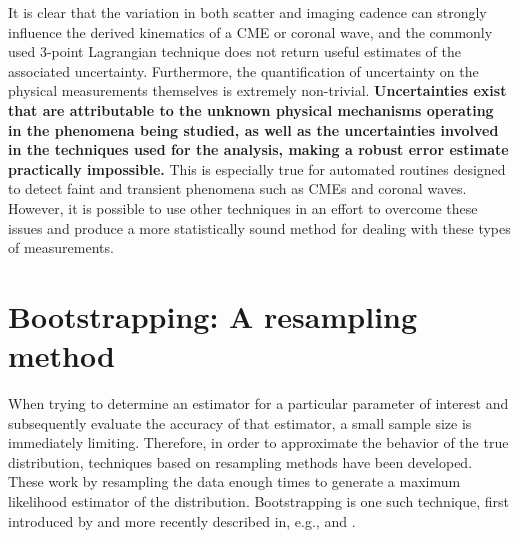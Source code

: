 \documentclass[structabstract]{aa}
\begin{document}
It is clear that the variation in both scatter and imaging cadence can strongly influence the derived kinematics of a CME or coronal wave, and the commonly used 3-point Lagrangian technique does not return useful estimates of the associated uncertainty. Furthermore, the quantification of uncertainty on the physical measurements themselves is extremely non-trivial. {\bf Uncertainties exist that are attributable to the unknown physical mechanisms operating in the phenomena being studied, as well as the uncertainties involved in the techniques used for the analysis, making a robust error estimate practically impossible.} This is especially true for automated routines designed to detect faint and transient phenomena such as CMEs and coronal waves. However, it is possible to use other techniques in an effort to overcome these issues and produce a more statistically sound method for dealing with these types of measurements.


\section{Bootstrapping: A resampling method}
\label{sect:bootstrapping}

When trying to determine an estimator for a particular parameter of interest and subsequently evaluate the accuracy of that estimator, a small sample size is immediately limiting. Therefore, in order to approximate the behavior of the true distribution, techniques based on resampling methods have been developed. These work by resampling the data enough times to generate a maximum likelihood estimator of the distribution. Bootstrapping is one such technique, first introduced by \citet{Efron:1979p1831} and more recently described in, e.g., \citet{1994.book.Efron} and \citet{Chernick1999}. %
\end{document}
